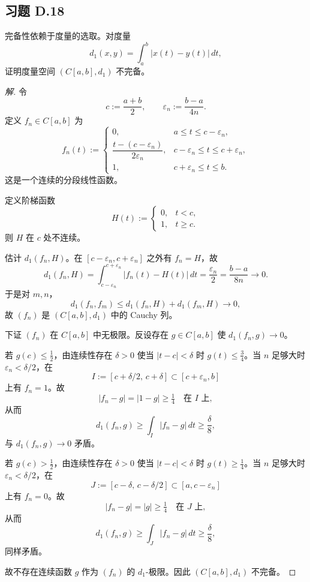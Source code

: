 \documentclass[11pt,a4paper]{article}
\theoremstyle{definition}
\newenvironment{solution}{\begin{proof}[解]}{\end{proof}}
\begin{document}
\subsection{习题 D.18}

完备性依赖于度量的选取。对度量
\[
  d_1(x,y)=\int_a^b |x(t)-y(t)|\,dt,
\]
证明度量空间 $(C[a,b], d_1)$ 不完备。

\begin{solution}
令
\[
  c:=\frac{a+b}{2}, \qquad \varepsilon_n:=\frac{b-a}{4n}.
\]
定义 $f_n\in C[a,b]$ 为
\[
  f_n(t):=
  \begin{cases}
    0, & a\le t\le c-\varepsilon_n, \\
    \dfrac{t-(c-\varepsilon_n)}{2\varepsilon_n},
    & c-\varepsilon_n\le t\le c+\varepsilon_n, \\
    1, & c+\varepsilon_n\le t\le b.
  \end{cases}
\]
这是一个连续的分段线性函数。

定义阶梯函数
\[
  H(t):=
  \begin{cases}
    0, & t<c, \\
    1, & t\ge c.
  \end{cases}
\]
则 $H$ 在 $c$ 处不连续。

估计 $d_1(f_n,H)$。在 $[c-\varepsilon_n,c+\varepsilon_n]$ 之外有 $f_n=H$，故
\[
  d_1(f_n,H)
  =\int_{c-\varepsilon_n}^{c+\varepsilon_n}|f_n(t)-H(t)|\,dt
  =\frac{\varepsilon_n}{2}
  =\frac{b-a}{8n}\to 0.
\]
于是对 $m,n$，
\[
  d_1(f_n,f_m)\le d_1(f_n,H)+d_1(f_m,H)\to 0,
\]
故 $(f_n)$ 是 $(C[a,b],d_1)$ 中的 Cauchy 列。

下证 $(f_n)$ 在 $C[a,b]$ 中无极限。反设存在 $g\in C[a,b]$ 使 $d_1(f_n,g)\to 0$。

若 $g(c)\le \tfrac12$，由连续性存在 $\delta>0$ 使当 $|t-c|<\delta$ 时 $g(t)\le \tfrac34$。当 $n$ 足够大时 $\varepsilon_n<\delta/2$，在
\[
  I:=[c+\delta/2,\,c+\delta]\subset[c+\varepsilon_n,b]
\]
上有 $f_n=1$。故
\[
  |f_n-g|=|1-g|\ge \tfrac14 \quad \text{在 } I \text{ 上},
\]
从而
\[
  d_1(f_n,g)\ge \int_I |f_n-g|\,dt\ge \frac{\delta}{8},
\]
与 $d_1(f_n,g)\to 0$ 矛盾。

若 $g(c)>\tfrac12$，由连续性存在 $\delta>0$ 使当 $|t-c|<\delta$ 时 $g(t)\ge \tfrac14$。当 $n$ 足够大时 $\varepsilon_n<\delta/2$，在
\[
  J:=[c-\delta,\,c-\delta/2]\subset[a,c-\varepsilon_n]
\]
上有 $f_n=0$。故
\[
  |f_n-g|=|g|\ge \tfrac14 \quad \text{在 } J \text{ 上},
\]
从而
\[
  d_1(f_n,g)\ge \int_J |f_n-g|\,dt\ge \frac{\delta}{8},
\]
同样矛盾。

故不存在连续函数 $g$ 作为 $(f_n)$ 的 $d_1$-极限。因此 $(C[a,b],d_1)$ 不完备。
\end{solution}
\end{document}
